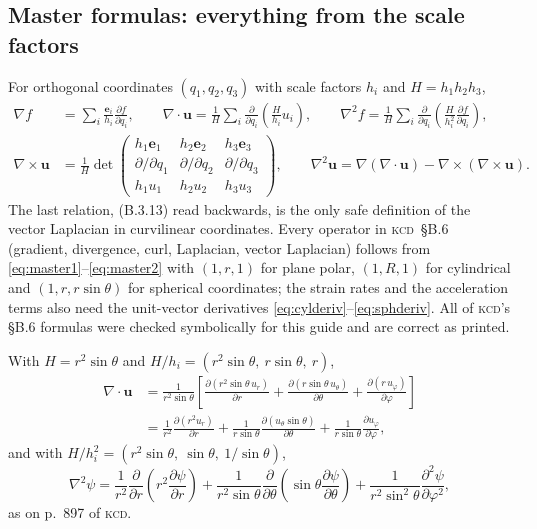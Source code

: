 \documentclass[11pt,letterpaper]{article}
\numberwithin{equation}{section}
\newcommand{\uu}{\mathbf{u}}
\newcommand{\e}[1]{\mathbf{e}_{#1}}
\newcommand{\pd}[2]{\frac{\partial #1}{\partial #2}}
\newcommand{\pdd}[2]{\frac{\partial^2 #1}{\partial #2^2}}
\newcommand{\Kundu}{\textnormal{\textsc{kcd}}}   %
\begin{document}
\subsection{Master formulas: everything from the scale factors}
For orthogonal coordinates $(q_1,q_2,q_3)$ with scale factors $h_i$ and $H=h_1h_2h_3$,
\begin{align}
\nabla f&=\sum_i\frac{\e{i}}{h_i}\pd{f}{q_i},\qquad
\nabla\cdot\uu=\frac1H\sum_i\pd{}{q_i}\!\left(\frac{H}{h_i}u_i\right),\qquad
\nabla^2 f=\frac1H\sum_i\pd{}{q_i}\!\left(\frac{H}{h_i^2}\pd{f}{q_i}\right),\label{eq:master1}\\
\nabla\times\uu&=\frac1H\det\begin{pmatrix}h_1\e{1}&h_2\e{2}&h_3\e{3}\\ \partial/\partial q_1&\partial/\partial q_2&\partial/\partial q_3\\ h_1u_1&h_2u_2&h_3u_3\end{pmatrix},
\qquad \nabla^2\uu=\nabla(\nabla\cdot\uu)-\nabla\times(\nabla\times\uu).\label{eq:master2}
\end{align}
The last relation, (B.3.13) read backwards, is the only safe definition of the vector Laplacian in curvilinear coordinates.
Every operator in \Kundu\ \S B.6 (gradient, divergence, curl, Laplacian, vector Laplacian) follows from
\eqref{eq:master1}--\eqref{eq:master2} with $(1,r,1)$ for plane polar, $(1,R,1)$ for cylindrical and $(1,r,r\sin\theta)$ for
spherical coordinates; the strain rates and the acceleration terms also need the unit-vector derivatives
\eqref{eq:cylderiv}--\eqref{eq:sphderiv}. All of \Kundu's \S B.6 formulas were checked symbolically for this guide and are
correct as printed.

\begin{worked}\label{we:sphdiv}
With $H=r^2\sin\theta$ and $H/h_i=(r^2\sin\theta,\ r\sin\theta,\ r)$,
\begin{align*}
\nabla\cdot\uu&=\frac{1}{r^2\sin\theta}\left[\pd{(r^2\sin\theta\,u_r)}{r}+\pd{(r\sin\theta\,u_\theta)}{\theta}+\pd{(r\,u_\varphi)}{\varphi}\right]\\
&=\frac{1}{r^2}\pd{(r^2u_r)}{r}+\frac{1}{r\sin\theta}\pd{(u_\theta\sin\theta)}{\theta}+\frac{1}{r\sin\theta}\pd{u_\varphi}{\varphi},
\end{align*}
and with $H/h_i^2=(r^2\sin\theta,\ \sin\theta,\ 1/\sin\theta)$,
\[
\nabla^2\psi=\frac{1}{r^2}\pd{}{r}\!\left(r^2\pd{\psi}{r}\right)+\frac{1}{r^2\sin\theta}\pd{}{\theta}\!\left(\sin\theta\pd{\psi}{\theta}\right)
+\frac{1}{r^2\sin^2\theta}\pdd{\psi}{\varphi},
\]
as on p.~897 of \Kundu.
\end{worked}
\end{document}

